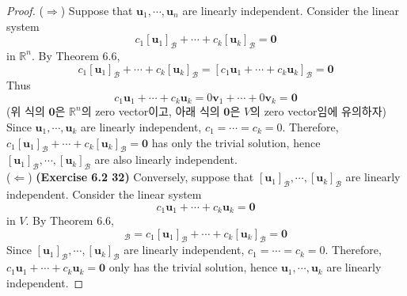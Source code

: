 
\begin{proof}
	($\Rightarrow$) Suppose that $\textbf{u}_1, \cdots,\textbf{u}_n$ are linearly independent. Consider the linear system \begin{equation*}
		c_1[\textbf{u}_1]_\mathcal{B} + \cdots + c_k[\textbf{u}_k]_\mathcal{B} = \textbf{0}
	\end{equation*} in $\mathbb{R}^n$. By Theorem 6.6, \begin{equation*}
		c_1[\textbf{u}_1]_\mathcal{B} + \cdots + c_k[\textbf{u}_k]_\mathcal{B} = [c_1\textbf{u}_1 + \cdots + c_k\textbf{u}_k]_\mathcal{B} = \textbf{0}
	\end{equation*} Thus \begin{equation*}
		c_1\textbf{u}_1 + \cdots + c_k\textbf{u}_k = 0\textbf{v}_1 + \cdots + 0\textbf{v}_k = \textbf{0}
	\end{equation*} ({\color{blue}위 식의 $\textbf{0}$은 $\mathbb{R}^n$의 zero vector이고, 아래 식의 $\textbf{0}$은 $V$의 zero vector임에 유의하자}) Since $\textbf{u}_1, \cdots, \textbf{u}_k$ are linearly independent, $c_1 = \cdots = c_k = 0$. Therefore, $c_1[\textbf{u}_1]_\mathcal{B} + \cdots + c_k[\textbf{u}_k]_\mathcal{B} = \textbf{0}$ has only the trivial solution, hence $[\textbf{u}_1]_\mathcal{B}, \cdots, [\textbf{u}_k]_\mathcal{B}$ are also linearly independent.\\
	
	($\Leftarrow$) \textbf{(Exercise 6.2 32)} Conversely, suppose that $[\textbf{u}_1]_\mathcal{B}, \cdots, [\textbf{u}_k]_\mathcal{B}$ are linearly independent. Consider the linear system \begin{equation*}
		c_1\textbf{u}_1 + \cdots + c_k\textbf{u}_k = \textbf{0}
	\end{equation*} in $V$. By Theorem 6.6, \begin{equation*}
		[c_1\textbf{u}_1 + \cdots + c_k\textbf{u}_k]_\mathcal{B} = c_1[\textbf{u}_1]_\mathcal{B} + \cdots + c_k[\textbf{u}_k]_\mathcal{B} = \textbf{0}
	\end{equation*} Since $[\textbf{u}_1]_\mathcal{B}, \cdots, [\textbf{u}_k]_\mathcal{B}$ are linearly independent, $c_1 = \cdots = c_k = 0$. Therefore, $c_1\textbf{u}_1 + \cdots + c_k\textbf{u}_k = \textbf{0}$ only has the trivial solution, hence $\textbf{u}_1, \cdots, \textbf{u}_k$ are linearly independent.
\end{proof}

